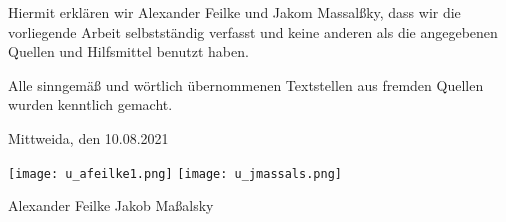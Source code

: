 \documentclass[a4paper,ngerman,12pt]{report}
\begin{document}
Hiermit erklären wir Alexander Feilke und Jakom Massal{\ss}ky, dass wir die vorliegende Arbeit selbstständig verfasst und keine anderen als die angegebenen Quellen und Hilfsmittel benutzt haben.

Alle sinngemä{\ss} und wörtlich übernommenen Textstellen aus fremden Quellen wurden kenntlich gemacht.

Mittweida, den 10.08.2021

\vspace{2cm}

\texttt{[image: u\_afeilke1.png]} \hspace{3cm} \texttt{[image: u\_jmassals.png]}

Alexander Feilke \hspace{4cm} Jakob Ma{\ss}alsky
\end{document}
